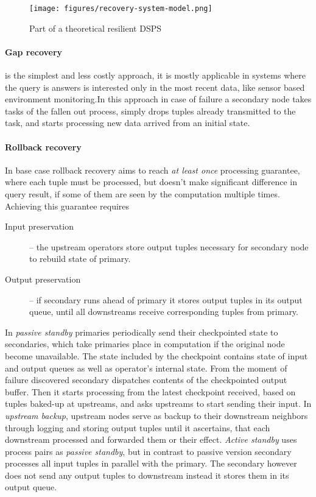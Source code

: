 \begin{figure}[!ht]
  \centering    
      \texttt{[image: figures/recovery-system-model.png]}
  \caption{Part of a theoretical resilient DSPS \cite{highavailibilityalg}}
  \label{fig:recovery-system-model}
\end{figure} 

\paragraph{Gap recovery} is the simplest and less costly approach, it is mostly applicable in systems where the query is answers is interested only in the most recent data, like sensor based  environment monitoring.In this approach in case of failure a secondary node takes tasks of the fallen out process, simply drops tuples already transmitted to the task, and starts processing new data arrived from an initial state.

\paragraph{Rollback recovery} In base case rollback recovery aims to reach \textit{at least once} processing guarantee, where each tuple must be processed, but doesn't make significant difference in query result, if some of them are seen by the computation multiple times. Achieving this guarantee requires 
\begin{description}
\item[Input preservation] -- the upstream operators store output tuples necessary  for secondary node to rebuild state of primary.
\item[Output preservation] -- if secondary runs ahead of primary it stores output tuples in its output queue, until all downstreams receive corresponding tuples from primary. 
\end{description}
In \textit{passive standby} primaries periodically send their checkpointed state to secondaries, which take primaries place in computation if the original node become unavailable. The state included by the checkpoint contains state of input and output queues as well as operator's internal state. From the moment of failure discovered secondary dispatches contents of the checkpointed output buffer. Then it starts processing from the latest checkpoint received, based on tuples baked-up at upstreams, and asks upstreams to start sending their input.
In \textit{upstream backup}, upstream nodes serve as backup to their downstream neighbors through logging and storing output tuples until it ascertains, that each downstream processed and forwarded them or their effect.
\textit{Active standby} uses process pairs as \textit{passive standby}, but in contrast to passive  version secondary processes all input tuples in parallel with the primary. The secondary however does not send any output tuples to downstream instead it stores them in its output queue. 
